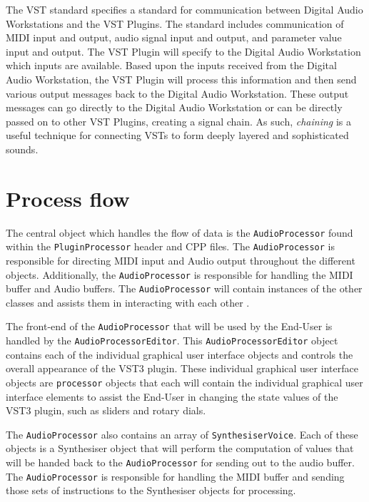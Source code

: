 \documentclass[a4paper,12pt]{report}
\begin{document}
The VST standard specifies a standard for communication between Digital Audio Workstations and the VST Plugins. The standard includes communication of MIDI input and output, audio signal input and output, and parameter value input and output. The VST Plugin will specify to the Digital Audio Workstation which inputs are available. Based upon the inputs received from the Digital Audio Workstation, the VST Plugin will process this information and then send various output messages back to the Digital Audio Workstation. These output messages can go directly to the Digital Audio Workstation or can be directly passed on to other VST Plugins, creating a signal chain. As such, \emph{chaining} is a useful technique for connecting VSTs to form deeply layered and sophisticated sounds.

\section{Process flow}
\label{sec:processflow}
The central object which handles the flow of data is the \texttt{Audio\-Processor} found within the \texttt{Plugin\-Processor} header and CPP files. The \texttt{Audio\-Processor} is responsible for directing MIDI input and Audio output throughout the different objects. Additionally, the \texttt{Audio\-Processor} is responsible for handling the MIDI buffer and Audio buffers. The \texttt{Audio\-Processor} will contain instances of the other classes and assists them in interacting with each other \cite{juceclassindex}.

The front-end of the \texttt{Audio\-Processor} that will be used by the End-User is handled by the \texttt{Audio\-Processor\-Editor}. This \texttt{Audio\-Processor\-Editor} object contains each of the individual graphical user interface objects and controls the overall appearance of the VST3 plugin. These individual graphical user interface objects are \texttt{processor} objects that each will contain the individual graphical user interface elements to assist the End-User in changing the state values of the VST3 plugin, such as sliders and rotary dials.

The \texttt{Audio\-Processor} also contains an array of \texttt{Synthesiser\-Voice}. Each of these objects is a Synthesiser object that will perform the computation of values that will be handed back to the \texttt{Audio\-Processor}  for sending out to the audio buffer. The \texttt{Audio\-Processor} is responsible for handling the MIDI buffer and sending those sets of instructions to the Synthesiser objects for processing.
\end{document}
